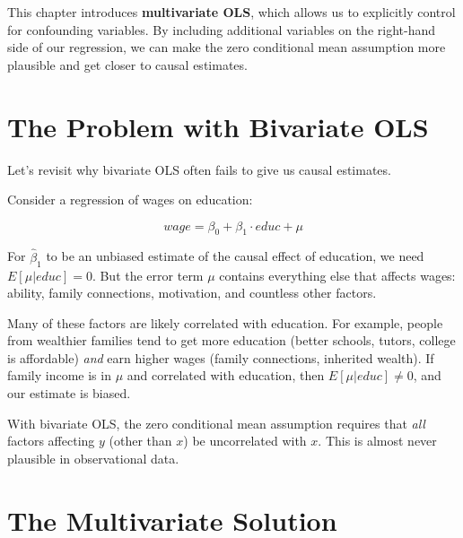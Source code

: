 \documentclass[
  letterpaper,
  DIV=11,
  numbers=noendperiod]{scrreprt}
\begin{document}
This chapter introduces \textbf{multivariate OLS}, which allows us to
explicitly control for confounding variables. By including additional
variables on the right-hand side of our regression, we can make the zero
conditional mean assumption more plausible and get closer to causal
estimates.

\section{The Problem with Bivariate
OLS}\label{the-problem-with-bivariate-ols}

Let's revisit why bivariate OLS often fails to give us causal estimates.

Consider a regression of wages on education:

\[
wage = \beta_0 + \beta_1 \cdot educ + \mu
\]

For \(\hat{\beta}_1\) to be an unbiased estimate of the causal effect of
education, we need \(E[\mu | educ] = 0\). But the error term \(\mu\)
contains everything else that affects wages: ability, family
connections, motivation, and countless other factors.

Many of these factors are likely correlated with education. For example,
people from wealthier families tend to get more education (better
schools, tutors, college is affordable) \emph{and} earn higher wages
(family connections, inherited wealth). If family income is in \(\mu\)
and correlated with education, then \(E[\mu | educ] \neq 0\), and our
estimate is biased.

\begin{tcolorbox}[enhanced jigsaw, arc=.35mm, bottomrule=.15mm, bottomtitle=1mm, breakable, colback=white, colbacktitle=quarto-callout-important-color!10!white, colframe=quarto-callout-important-color-frame, coltitle=black, left=2mm, leftrule=.75mm, opacityback=0, opacitybacktitle=0.6, rightrule=.15mm, title=\textcolor{quarto-callout-important-color}{\faExclamation}\hspace{0.5em}{The Core Problem}, titlerule=0mm, toprule=.15mm, toptitle=1mm]

With bivariate OLS, the zero conditional mean assumption requires that
\emph{all} factors affecting \(y\) (other than \(x\)) be uncorrelated
with \(x\). This is almost never plausible in observational data.

\end{tcolorbox}

\section{The Multivariate Solution}\label{the-multivariate-solution}
\end{document}
